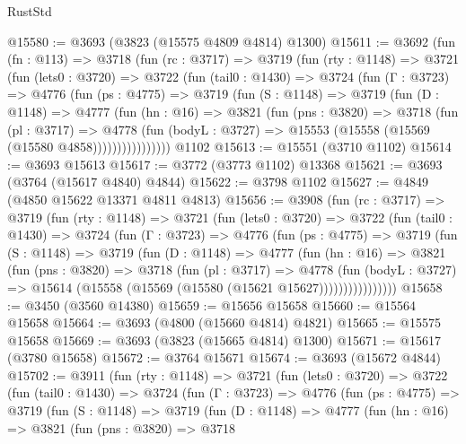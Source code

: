 \begin{lexlean}{RustStd}
\begin{coremodule}
@15580 := @3693 (@3823 (@15575 @4809 @4814) @1300)
@15611 := @3692
    (fun (fn : @113) =>
    @3718
      (fun (rc : @3717) =>
      @3719
        (fun (rty : @1148) =>
        @3721
          (fun (lets0 : @3720) =>
          @3722
            (fun (tail0 : @1430) =>
            @3724
              (fun (Γ : @3723) =>
              @4776
                (fun (ps : @4775) =>
                @3719
                  (fun (S : @1148) =>
                  @3719
                    (fun (D : @1148) =>
                    @4777
                      (fun (hn : @16) =>
                      @3821
                        (fun (pns : @3820) =>
                        @3718
                          (fun (pl : @3717) =>
                          @4778
                            (fun (bodyL : @3727) =>
                            @15553 (@15558 (@15569 (@15580 @4858))))))))))))))))
    @1102
@15613 := @15551 (@3710 @1102)
@15614 := @3693 @15613
@15617 := @3772 (@3773 @1102) @13368
@15621 := @3693 (@3764 (@15617 @4840) @4844)
@15622 := @3798 @1102
@15627 := @4849 (@4850 @15622 @13371 @4811 @4813)
@15656 := @3908
    (fun (rc : @3717) =>
    @3719
      (fun (rty : @1148) =>
      @3721
        (fun (lets0 : @3720) =>
        @3722
          (fun (tail0 : @1430) =>
          @3724
            (fun (Γ : @3723) =>
            @4776
              (fun (ps : @4775) =>
              @3719
                (fun (S : @1148) =>
                @3719
                  (fun (D : @1148) =>
                  @4777
                    (fun (hn : @16) =>
                    @3821
                      (fun (pns : @3820) =>
                      @3718
                        (fun (pl : @3717) =>
                        @4778
                          (fun (bodyL : @3727) =>
                          @15614 (@15558 (@15569 (@15580 (@15621 @15627))))))))))))))))
@15658 := @3450 (@3560 @14380)
@15659 := @15656 @15658
@15660 := @15564 @15658
@15664 := @3693 (@4800 (@15660 @4814) @4821)
@15665 := @15575 @15658
@15669 := @3693 (@3823 (@15665 @4814) @1300)
@15671 := @15617 (@3780 @15658)
@15672 := @3764 @15671
@15674 := @3693 (@15672 @4844)
@15702 := @3911
    (fun (rty : @1148) =>
    @3721
      (fun (lets0 : @3720) =>
      @3722
        (fun (tail0 : @1430) =>
        @3724
          (fun (Γ : @3723) =>
          @4776
            (fun (ps : @4775) =>
            @3719
              (fun (S : @1148) =>
              @3719
                (fun (D : @1148) =>
                @4777
                  (fun (hn : @16) =>
                  @3821
                    (fun (pns : @3820) =>
                    @3718

\end{coremodule}
\end{lexlean}
